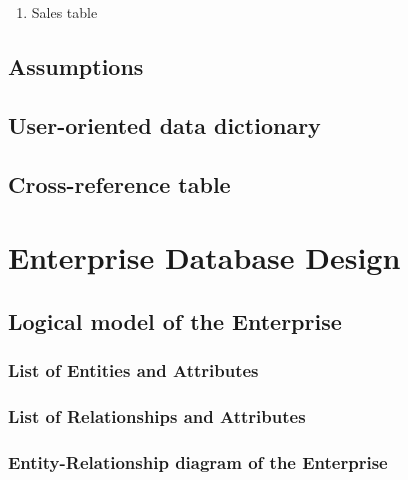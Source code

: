 \documentclass[11pt, a4paper]{report}
\begin{document}
\begin{enumerate}
\item Sales table
 
\end{enumerate}

\section{Assumptions}
\section{User-oriented data dictionary}
\section{Cross-reference table}

\chapter{Enterprise Database Design}

\section{Logical model of the Enterprise}
\subsection{List of Entities and Attributes}
\subsection{List of Relationships and Attributes}
\subsection{Entity-Relationship diagram of the Enterprise}
\end{document}
